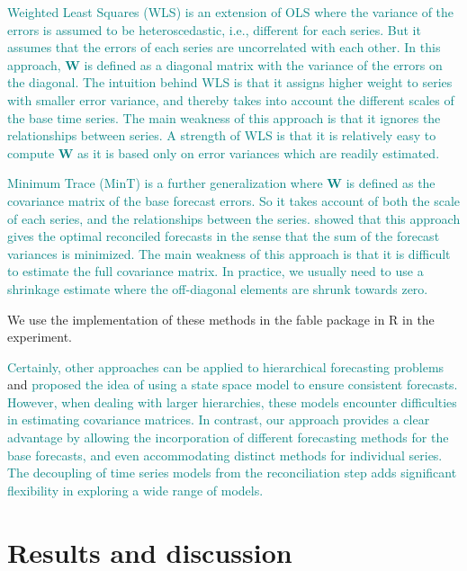 \documentclass[
  authoryear,
  preprint,
  3p]{elsarticle}
\begin{document}
\textcolor{teal}{Weighted Least Squares (WLS) is an extension of OLS where the variance of the errors is assumed to be heteroscedastic, i.e., different for each series. But it assumes that the errors of each series are uncorrelated with each other. In this approach, $\bm{W}$ is defined as a diagonal matrix with the variance of the errors on the diagonal. The intuition behind WLS is that it assigns higher weight to series with smaller error variance, and thereby takes into account the different scales of the base time series. The main weakness of this approach is that it ignores the relationships between series. A strength of WLS is that it is relatively easy to compute $\bm{W}$ as it is based only on error variances which are readily estimated.}

\textcolor{teal}{Minimum Trace (MinT) is a further generalization where $\bm{W}$ is defined as the covariance matrix of the base forecast errors. So it takes account of both the scale of each series, and the relationships between the series.}
\citet{WicEtAl2019}
\textcolor{teal}{showed that this approach gives the optimal reconciled forecasts in the sense that the sum of the forecast variances is minimized. The main weakness of this approach is that it is difficult to estimate the full covariance matrix. In practice, we usually need to use a shrinkage estimate where the off-diagonal elements are shrunk towards zero.}

We use the implementation of these methods in the fable package in R in
the experiment.

\textcolor{teal}{Certainly, other approaches can be applied to hierarchical forecasting problems}
\citet{pennings2017integrated} and \citet{villegas2018supply}
\textcolor{teal}{proposed the idea of using a state space model to ensure consistent forecasts. However, when dealing with larger hierarchies, these models encounter difficulties in estimating covariance matrices. In contrast, our approach provides a clear advantage by allowing the incorporation of different forecasting methods for the base forecasts, and even accommodating distinct methods for individual series. The decoupling of time series models from the reconciliation step adds significant flexibility in exploring a wide range of models.}

\hypertarget{sec-results}{%
\section{Results and discussion}\label{sec-results}}
\end{document}
